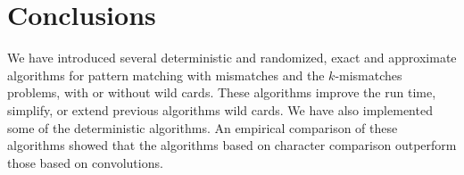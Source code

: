 \section{Conclusions}
We have  introduced several deterministic and randomized, exact and
approximate algorithms for pattern matching with mismatches and the $k$-mismatches
problems, with or without wild cards. These algorithms improve the run time, 
simplify, or extend previous algorithms wild cards. 
We have also implemented some of the deterministic algorithms. An empirical
comparison of these algorithms showed that the algorithms based on
character comparison outperform those based on convolutions.